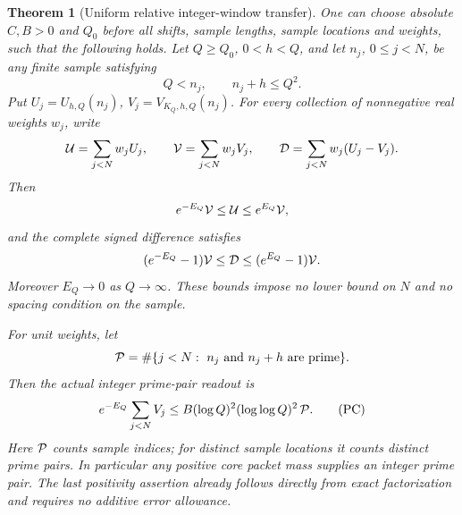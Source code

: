 \documentclass[11pt]{article}
\newtheorem{theorem}{Theorem}[section]
\begin{document}
\begin{theorem}[Uniform relative integer-window transfer]
\label{thm:relative-integer-window-transfer}
One can choose absolute \(C,B>0\) and \(Q_0\) before all shifts,
sample lengths, sample locations and weights, such that the following
holds. Let \(Q\geq Q_0\), \(0<h<Q\), and let
\(n_j\), \(0\leq j<N\), be any finite sample satisfying
\[
                         Q<n_j,\qquad n_j+h\leq Q^2.
\]
Put \(U_j=U_{h,Q}(n_j)\), \(V_j=V_{K_Q,h,Q}(n_j)\).
For every collection of nonnegative real weights \(w_j\), write
\[
 {\cal U}=\sum_{j<N}w_jU_j,\qquad
 {\cal V}=\sum_{j<N}w_jV_j,\qquad
 {\cal D}=\sum_{j<N}w_j(U_j-V_j).
\]
Then
\[
             e^{-E_Q}{\cal V}\leq{\cal U}
                              \leq e^{E_Q}{\cal V},
\]
and the complete signed difference satisfies
\[
 (e^{-E_Q}-1){\cal V}
       \leq {\cal D}\leq(e^{E_Q}-1){\cal V}.
\]
Moreover \(E_Q\longrightarrow0\) as \(Q\longrightarrow\infty\).
These bounds impose no lower bound on \(N\) and no spacing condition
on the sample.

For unit weights, let
\[
 {\cal P}=\#\{j<N:\ n_j\ \hbox{and}\ n_j+h\ \hbox{are prime}\}.
\]
Then the actual integer prime-pair readout is
\[
 e^{-E_Q}\sum_{j<N}V_j
     \leq B(\log Q)^2(\log\log Q)^2\,{\cal P}.
 \tag{PC}
\]
Here \({\cal P}\) counts sample indices; for distinct sample locations
it counts distinct prime pairs. In particular any positive core
packet mass supplies an integer prime pair. The last positivity
assertion already follows directly from exact factorization and
requires no additive error allowance.
\end{theorem}
\end{document}
